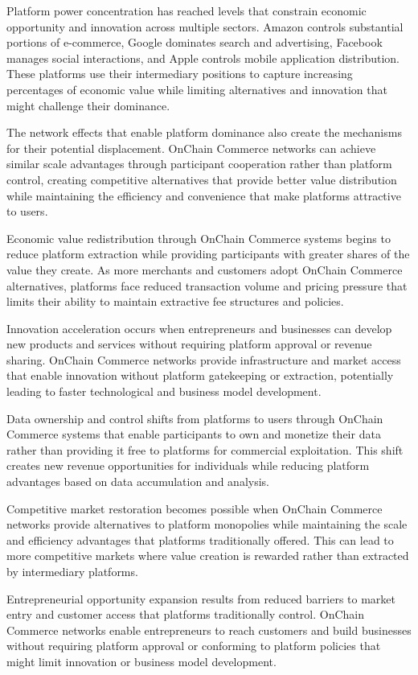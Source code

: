 \documentclass[
  Letterpaper,
]{scrbook}
\begin{document}
Platform power concentration has reached levels that constrain economic
opportunity and innovation across multiple sectors. Amazon controls
substantial portions of e-commerce, Google dominates search and
advertising, Facebook manages social interactions, and Apple controls
mobile application distribution. These platforms use their intermediary
positions to capture increasing percentages of economic value while
limiting alternatives and innovation that might challenge their
dominance.

The network effects that enable platform dominance also create the
mechanisms for their potential displacement. OnChain Commerce networks
can achieve similar scale advantages through participant cooperation
rather than platform control, creating competitive alternatives that
provide better value distribution while maintaining the efficiency and
convenience that make platforms attractive to users.

Economic value redistribution through OnChain Commerce systems begins to
reduce platform extraction while providing participants with greater
shares of the value they create. As more merchants and customers adopt
OnChain Commerce alternatives, platforms face reduced transaction volume
and pricing pressure that limits their ability to maintain extractive
fee structures and policies.

Innovation acceleration occurs when entrepreneurs and businesses can
develop new products and services without requiring platform approval or
revenue sharing. OnChain Commerce networks provide infrastructure and
market access that enable innovation without platform gatekeeping or
extraction, potentially leading to faster technological and business
model development.

Data ownership and control shifts from platforms to users through
OnChain Commerce systems that enable participants to own and monetize
their data rather than providing it free to platforms for commercial
exploitation. This shift creates new revenue opportunities for
individuals while reducing platform advantages based on data
accumulation and analysis.

Competitive market restoration becomes possible when OnChain Commerce
networks provide alternatives to platform monopolies while maintaining
the scale and efficiency advantages that platforms traditionally
offered. This can lead to more competitive markets where value creation
is rewarded rather than extracted by intermediary platforms.

Entrepreneurial opportunity expansion results from reduced barriers to
market entry and customer access that platforms traditionally control.
OnChain Commerce networks enable entrepreneurs to reach customers and
build businesses without requiring platform approval or conforming to
platform policies that might limit innovation or business model
development.
\end{document}
